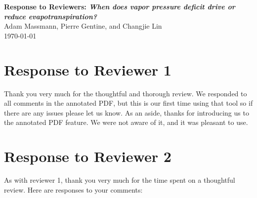 \documentclass[12pt]{article}
\begin{document}
\large \textbf{Response to Reviewers: \textit{When does vapor pressure deficit drive or reduce
    evapotranspiration?}} \\
Adam Massmann, Pierre Gentine, and Changjie Lin \\
\today

\vspace{0.1in}

\normalsize
\section{Response to Reviewer 1}

Thank you very much for the thoughtful and thorough review. We
responded to all comments in the annotated PDF, but this is our first
time using that tool so if there are any issues please let us know. As
an aside, thanks for introducing us to the annotated PDF feature. We
were not aware of it, and it was pleasant to use.

\section{Response to Reviewer 2}

As with reviewer 1, thank you very much for the time spent on a
thoughtful review. Here are responses to your comments:
\end{document}
